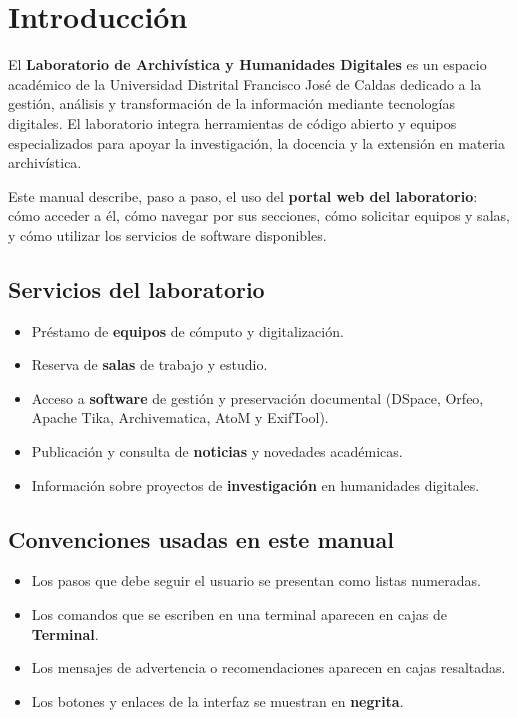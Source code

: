 \documentclass[12pt,a4paper]{report}
\begin{document}
\portadalab

\tableofcontents
\thispagestyle{chapternoline}

\chapter{Introducción}

El \textbf{Laboratorio de Archivística y Humanidades Digitales} es un espacio
académico de la Universidad Distrital Francisco José de Caldas dedicado a la
gestión, análisis y transformación de la información mediante tecnologías
digitales. El laboratorio integra herramientas de código abierto y equipos
especializados para apoyar la investigación, la docencia y la extensión en
materia archivística.

Este manual describe, paso a paso, el uso del \textbf{portal web del
laboratorio}: cómo acceder a él, cómo navegar por sus secciones, cómo solicitar
equipos y salas, y cómo utilizar los servicios de software disponibles.

\section*{Servicios del laboratorio}

\begin{itemize}
  \item Préstamo de \textbf{equipos} de cómputo y digitalización.
  \item Reserva de \textbf{salas} de trabajo y estudio.
  \item Acceso a \textbf{software} de gestión y preservación documental
        (DSpace, Orfeo, Apache Tika, Archivematica, AtoM y ExifTool).
  \item Publicación y consulta de \textbf{noticias} y novedades académicas.
  \item Información sobre proyectos de \textbf{investigación} en humanidades
        digitales.
\end{itemize}

\section*{Convenciones usadas en este manual}

\begin{itemize}
  \item Los pasos que debe seguir el usuario se presentan como listas numeradas.
  \item Los comandos que se escriben en una terminal aparecen en cajas de
        \textbf{Terminal}.
  \item Los mensajes de advertencia o recomendaciones aparecen en cajas
        resaltadas.
  \item Los botones y enlaces de la interfaz se muestran en \textbf{negrita}.
\end{itemize}
\end{document}
